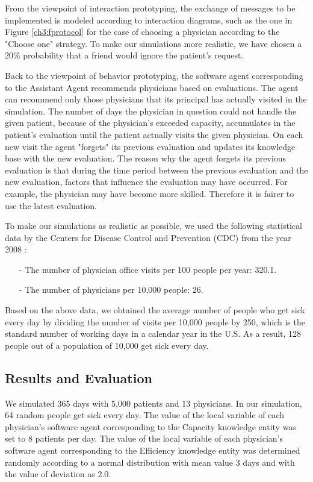 From the viewpoint of interaction prototyping, the exchange of messages to be implemented is modeled according to interaction diagrams, such as the one in Figure \ref{ch3:fprotocol} for the case of choosing a physician according to the "Choose one" strategy. To make our simulations more realistic, we have chosen a 20\% probability that a friend would ignore the patient's request.

Back to the viewpoint of behavior prototyping, the software agent corresponding to the Assistant Agent recommends physicians based on evaluations. The agent can recommend only those physicians that its principal has actually visited in the simulation. The number of days the physician in question could not handle the given patient, because of the physician's exceeded capacity, accumulates in the patient's evaluation until the patient actually visits the given physician. On each new visit the agent "forgets" its previous evaluation and updates its knowledge base with the new evaluation. The reason why the agent forgets its previous evaluation is that during the time period between the previous evaluation and the new evaluation, factors that influence the evaluation may have occurred. For example, the physician may have become more skilled. Therefore it is fairer to use the latest evaluation.

To make our simulations as realistic as possible, we used the following statistical data by the Centers for Disease Control and Prevention (CDC) from the year 2008 \cite{visit}:
\begin{itemize}
\item[-]The number of physician office visits per 100 people per year: 320.1.
\item[-]The number of physicians per 10,000 people: 26.
\end{itemize}
	
Based on the above data, we obtained the average number of people who get sick every day by dividing the number of visits per 10,000 people by 250, which is the standard number of working days in a calendar year in the U.S. As a result, 128 people out of a population of 10,000 get sick every day.

\subsection{Results and Evaluation}
We simulated 365 days with 5,000 patients and 13 physicians. In our simulation, 64 random people get sick every day. The value of the local variable of each physician's software agent corresponding to the Capacity knowledge entity was set to 8 patients per day. The value of the local variable of each physician's software agent corresponding to the Efficiency knowledge entity was determined randomly according to a normal distribution with mean value 3 days and with the value of deviation as 2.0.

